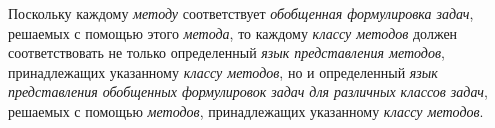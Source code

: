 Поскольку каждому \textit{методу} соответствует \textit{обобщенная формулировка задач}, решаемых с помощью этого \textit{метода}, то каждому \textit{классу методов} должен соответствовать не только определенный \textit{язык представления методов}, принадлежащих указанному \textit{классу методов}, но и определенный \textit{язык представления обобщенных формулировок задач для различных классов задач}, решаемых с помощью \textit{методов}, принадлежащих указанному \textit{классу методов}.

\begin{comment}
	

\section{Понятие деятельности, вида деятельности и технологии}
\label{sec_activity_and_technology}

\begin{SCn}
	\begin{scnrelfromlist}{ключевое понятие}
		\scnitem{деятельность}
		\scnitem{вид деятельности}
		\scnitem{анализ}
		\scnitem{проектирование}
		\scnitem{разработка плана производства}
		\scnitem{производство}
		\scnitem{реинжиниринг}
		\scnitem{технология}
	\end{scnrelfromlist}

	\begin{scnrelfromlist}{ключевое отношение}
		\scnitem{контекст*}
		\scnitem{технология*}
	\end{scnrelfromlist}
\end{SCn}

Понятие \textbf{\textit{деятельности}} трактуется как сложный процесс, состоящий из действий, направленных на достижение нескольких \uline{разных} целей (то есть целей, не связанных отношением \scnqq{цель-подцель}). При этом некоторые из указанных \scnqq{максимальных} целей могут достигаться с помощью одного и того же метода или одного и того же (фиксированного) семейства методов.

\textit{деятельность} --- это целостный процесс \uline{поведения} (функционирования) одного субъекта или сообщества субъектов, осуществляемый на основе хорошо или не очень хорошо продуманной и согласованной \textit{технологии} в последнем случае качество деятельности определяется уровнем интеллекта единоличного или коллективного субъекта, осуществляющего этот процесс.


\end{comment}
